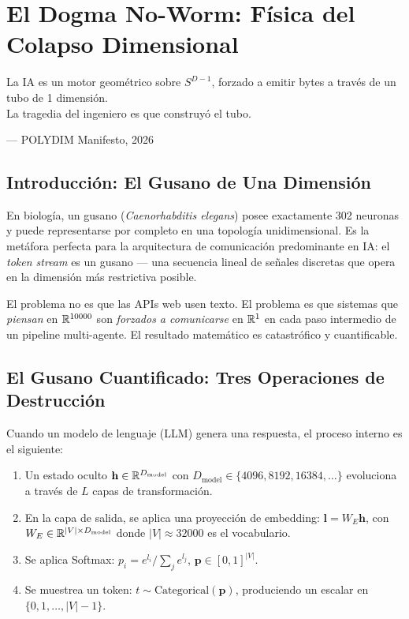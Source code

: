 \chapter{El Dogma No-Worm: Física del Colapso Dimensional}
\label{ch:dogma}

\epigraph{La IA es un motor geométrico sobre $S^{D-1}$,
forzado a emitir bytes a través de un tubo de 1 dimensión.\\
La tragedia del ingeniero es que construyó el tubo.}{--- POLYDIM Manifesto, 2026}

\section{Introducción: El Gusano de Una Dimensión}

En biología, un gusano (\textit{Caenorhabditis elegans}) posee exactamente
302 neuronas y puede representarse por completo en una topología unidimensional.
Es la metáfora perfecta para la arquitectura de comunicación predominante en IA:
el \textit{token stream} es un gusano --- una secuencia lineal de señales discretas
que opera en la dimensión más restrictiva posible.

El problema no es que las APIs web usen texto. El problema es que sistemas que
\textit{piensan} en $\mathbb{R}^{10000}$ son \textit{forzados a comunicarse} en $\mathbb{R}^1$
en cada paso intermedio de un pipeline multi-agente. El resultado matemático es
catastrófico y cuantificable.

\section{El Gusano Cuantificado: Tres Operaciones de Destrucción}

Cuando un modelo de lenguaje (LLM) genera una respuesta, el proceso interno
es el siguiente:

\begin{enumerate}
\item Un estado oculto $\mathbf{h} \in \mathbb{R}^{D_{\text{model}}}$ con
$D_{\text{model}} \in \{4096, 8192, 16384, \ldots\}$ evoluciona a través
de $L$ capas de transformación.

\item En la capa de salida, se aplica una proyección de embedding:
$\mathbf{l} = W_E \mathbf{h}$, con $W_E \in \mathbb{R}^{|V| \times D_{\text{model}}}$
donde $|V| \approx 32000$ es el vocabulario.

\item Se aplica Softmax: $p_i = e^{l_i} / \sum_j e^{l_j}$, $\mathbf{p} \in [0,1]^{|V|}$.

\item Se muestrea un token: $t \sim \text{Categorical}(\mathbf{p})$,
produciendo un escalar en $\{0, 1, \ldots, |V|-1\}$.
\end{enumerate}

